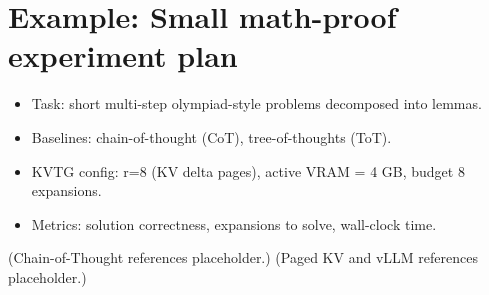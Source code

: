 \documentclass[11pt,onecolumn,letterpaper]{article}
\begin{document}
\section{Example: Small math-proof experiment plan}
\begin{itemize}[nosep]
  \item Task: short multi-step olympiad-style problems decomposed into lemmas.
  \item Baselines: chain-of-thought (CoT), tree-of-thoughts (ToT).
  \item KVTG config: r=8 (KV delta pages), active VRAM = 4 GB, budget 8 expansions.
  \item Metrics: solution correctness, expansions to solve, wall-clock time.
\end{itemize}


\begin{thebibliography}{9}
  (Chain-of-Thought references placeholder.)
  (Paged KV and vLLM references placeholder.)
\end{thebibliography}
\end{document}
